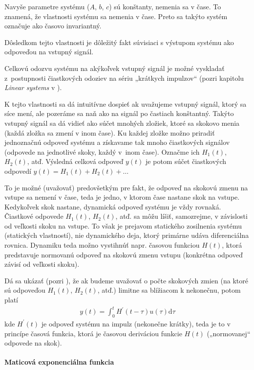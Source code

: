 \documentclass[a4paper, 10pt, ]{article}
\begin{document}
Navyše parametre systému ($A$, $b$, $c$) sú konštanty, nemenia sa v čase. To znamená, že vlastnosti systému sa nemenia v čase. Preto sa takýto systém označuje ako časovo invariantný.

Dôsledkom tejto vlastnosti je dôležitý fakt súvisiaci s výstupom systému ako odpoveďou na vstupný signál.

Celkovú odozvu systému na akýkoľvek vstupný signál je možné vyskladať z~postupnosti čiastkových odoziev na sériu „krátkych impulzov“ (pozri kapitolu \emph{Linear systems} v \cite{AsM08se}).

K tejto vlastnosti sa dá intuitívne dospieť ak uvažujeme vstupný signál, ktorý sa síce mení, ale pozeráme sa naň ako na signál po častiach konštantný. Takýto vstupný signál sa dá vidieť ako súčet mnohých zložiek, ktoré sa skokovo menia (každá zložka sa zmení v inom čase). Ku každej zložke možno priradiť jednoznačnú odpoveď systému a získavame tak mnoho čiastkových signálov (odpovede na jednotlivé skoky, každý v~inom čase). Označme ich $H_1(t)$, $H_2(t)$, atď. Výsledná celková odpoveď $y(t)$ je potom súčet čiastkových odpovedí $y(t) = H_1(t) + H_2(t) + \ldots$

To je možné (uvažovať) predovšetkým pre fakt, že odpoveď na skokovú zmenu na vstupe sa nemení v čase, teda je jedno, v ktorom čase nastane skok na vstupe. Kedykoľvek skok nastane, dynamická odpoveď systému je vždy rovnaká. Čiastkové odpovede $H_1(t)$, $H_2(t)$, atď. sa môžu líšiť, samozrejme, v závislosti od veľkosti skoku na vstupe. To však je prejavom statického zosilnenia systému (statických vlastností), nie dynamického deja, ktorý primárne udáva diferenciálna rovnica. Dynamiku teda možno vystihnúť napr. časovou funkciou $H(t)$, ktorá predstavuje normovanú odpoveď na skokovú zmenu vstupu (konkrétna odpoveď závisí od veľkosti skoku).

Dá sa ukázať (pozri \cite{AsM08se}), že ak budeme uvažovať o počte skokových zmien (na ktoré sú odpoveďou $H_1(t)$, $H_2(t)$, atď.) limitne sa blížiacom k nekonečnu, potom platí
\begin{align}
	y(t) = \int_0^t H^\prime(t - \tau)u(\tau) \text{d}\tau
\end{align}
kde $H^\prime(t)$ je odpoveď systému na impulz (nekonečne krátky), teda je to v princípe časová funkcia, ktorá je časovou deriváciou funkcie $H(t)$ („normovanej“ odpovede na skok).



\paragraph{Maticová exponenciálna funkcia}
\end{document}
